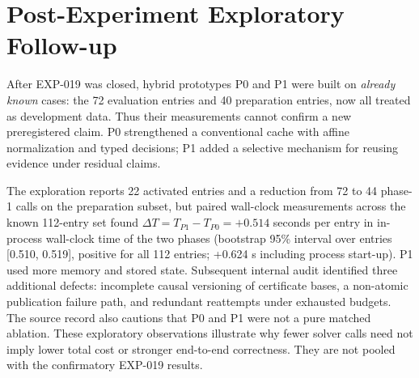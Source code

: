 \documentclass[10pt,twocolumn]{article}
\begin{document}
\section{Post-Experiment Exploratory Follow-up}
After EXP-019 was closed, hybrid prototypes P0 and P1 were built on \emph{already known} cases: the 72 evaluation entries and 40 preparation entries, now all treated as development data. Thus their measurements cannot confirm a new preregistered claim. P0 strengthened a conventional cache with affine normalization and typed decisions; P1 added a selective mechanism for reusing evidence under residual claims.

The exploration reports 22 activated entries and a reduction from 72 to 44 phase-1 calls on the preparation subset, but paired wall-clock measurements across the known 112-entry set found $\Delta T=T_{P1}-T_{P0}=+0.514$ seconds per entry in in-process wall-clock time of the two phases (bootstrap 95\% interval over entries [0.510, 0.519], positive for all 112 entries; +0.624 s including process start-up). P1 used more memory and stored state. Subsequent internal audit identified three additional defects: incomplete causal versioning of certificate bases, a non-atomic publication failure path, and redundant reattempts under exhausted budgets. The source record also cautions that P0 and P1 were not a pure matched ablation. These exploratory observations illustrate why fewer solver calls need not imply lower total cost or stronger end-to-end correctness. They are not pooled with the confirmatory EXP-019 results.
\end{document}
